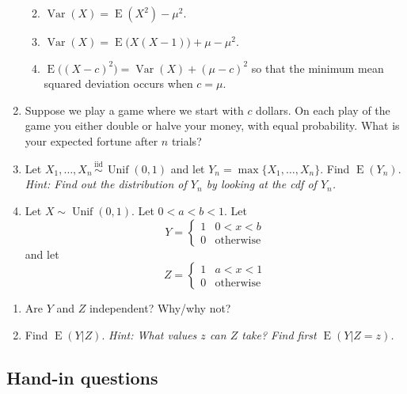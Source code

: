 \documentclass[
]{book}
\providecommand{\tightlist}{%
  \setlength{\itemsep}{0pt}\setlength{\parskip}{0pt}}
\DeclareMathOperator{\E}{E}
\DeclareMathOperator{\Var}{Var}
\DeclareMathOperator{\Unif}{Unif}
\newcommand{\iid}{\,\overset{\text{iid}}{\sim}\,}
\theoremstyle{definition}
\theoremstyle{definition}
\theoremstyle{definition}
\theoremstyle{definition}
\theoremstyle{remark}
\begin{document}
\begin{enumerate}
  \begin{enumerate}
  \def\labelenumii{(\alph{enumii})}
  \tightlist
  \item
    \(\Var(X) = \E(X^2) - \mu^2\).
  \item
    \(\Var(X) = \E\big(X(X-1)\big) +\mu -\mu^2\).
  \item
    \(\E\big((X-c)^2\big) = \Var(X) + (\mu-c)^2\) so that the minimum mean squared deviation occurs when \(c=\mu\).
  \end{enumerate}
\item
  Suppose we play a game where we start with \(c\) dollars. On each play of the game you either double or halve your money, with equal probability. What is your expected fortune after \(n\) trials?
\item
  Let \(X_1,\dots,X_n\iid \Unif(0,1)\) and let \(Y_n=\max\{X_1,\dots,X_n\}\). Find \(\E(Y_n)\). \emph{Hint: Find out the distribution of \(Y_n\) by looking at the cdf of \(Y_n\).}
\item
  Let \(X\sim\Unif(0,1)\). Let \(0<a<b<1\). Let
  \[
   Y = \begin{cases}
  1 & 0<x<b \\
  0 &\text{otherwise}
   \end{cases}
  \]
  and let
  \[
   Z = \begin{cases}
  1 & a<x<1 \\
  0 &\text{otherwise}
   \end{cases}
  \]
\end{enumerate}

\begin{enumerate}
\def\labelenumi{(\alph{enumi})}
\tightlist
\item
  Are \(Y\) and \(Z\) independent? Why/why not?\\
\item
  Find \(\E(Y|Z)\). \emph{Hint: What values \(z\) can \(Z\) take? Find first \(\E(Y|Z=z)\).}
\end{enumerate}

\hypertarget{hand-in-questions}{%
\subsection*{Hand-in questions}\label{hand-in-questions}}
\end{document}
